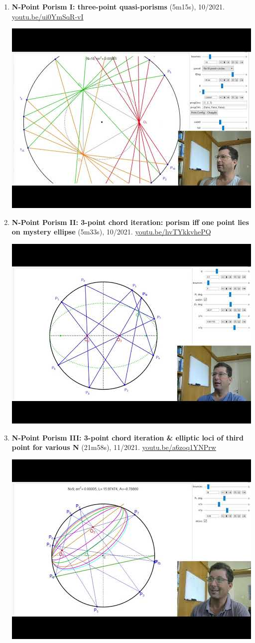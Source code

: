 \documentclass[12pt]{article}
\begin{document}
\begin{enumerate}[resume]
\item \textbf{N-Point Porism I: three-point quasi-porisms} (5m15s), 10/2021. \href{https://youtu.be/ui0YmSqR-vI}{\url{youtu.be/ui0YmSqR-vI}}
\begin{center}\includegraphics[width=.5\textwidth]{pics/ui0YmSqR-vI.jpg}\end{center}
% 
\item \textbf{N-Point Porism II: 3-point chord iteration: porism iff one point lies on mystery ellipse} (5m33s), 10/2021. \href{https://youtu.be/hvTYkkvhePQ}{\url{youtu.be/hvTYkkvhePQ}}
\begin{center}\includegraphics[width=.5\textwidth]{pics/hvTYkkvhePQ.jpg}\end{center}
% 
\item \textbf{N-Point Porism III: 3-point chord iteration \& elliptic loci of third point for various N} (21m58s), 11/2021. \href{https://youtu.be/a6zoq1YNPrw}{\url{youtu.be/a6zoq1YNPrw}}
\begin{center}\includegraphics[width=.5\textwidth]{pics/a6zoq1YNPrw.jpg}\end{center}
% 
\end{enumerate}
\end{document}
